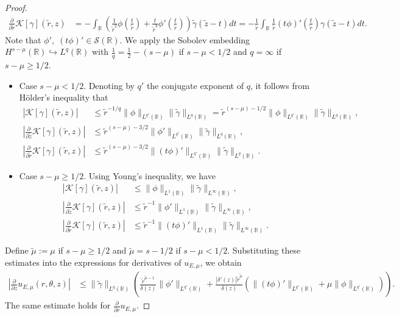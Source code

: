 ﻿\documentclass[11pt,reqno,oneside]{amsart}
\theoremstyle{definition}
\theoremstyle{remark}
\newcommand{\R}{\mathbb{R}}
\newcommand{\Sw}{\mathcal{S}}
\renewcommand{\d}{\delta}
\newcommand{\g}{\gamma}
\renewcommand{\t}{\theta}
\newcommand{\p}{\partial}
\begin{document}
\begin{proof}
\begin{align*}
                \frac{\p}{\p \widetilde{r}}\mathcal{K}[\g](\widetilde{r},z)&= -\int_\R \left(\frac{1}{\widetilde{r}^2}\phi(\frac{t}{\widetilde{r}})+\frac{t}{\widetilde{r}^3}\phi'(\frac{t}{\widetilde{r}})\right)\widetilde{\g}(\widetilde{z}-t)dt=-\frac{1}{\widetilde{r}}\int_\R \frac{1}{\widetilde{r}}(t\phi)'(\frac{t}{\widetilde{r}})\g(\widetilde{z}-t)dt.
            \end{align*}
            Note that $\phi',\;(t\phi)'\in \Sw(\R)$. We apply the Sobolev embedding $H^{s-\mu}(\R)\hookrightarrow L^q(\R)$ with $\frac{1}{q}=\frac{1}{2}-(s-\mu)$ if $s-\mu<1/2$ and $q=\infty$ if $s-\mu\geq 1/2$.
            \begin{itemize}
                \item Case $s-\mu <1/2$. Denoting by $q'$ the conjugate exponent of $q$, it follows from H\"older's inequality that
                \begin{align*}
                    \left|\mathcal{K}[\g](\widetilde{r},z)\right| &\leq \widetilde{r}^{-1/q} \|\phi\|_{L^{q'}(\R)} \|\widetilde{\g}\|_{L^q(\R)}=\widetilde{r}^{(s-\mu)-1/2} \|\phi\|_{L^{q'}(\R)} \|\widetilde{\g}\|_{L^q(\R)},\\
                    \left|\frac{\p}{\p \widetilde{z}}\mathcal{K}[\g](\widetilde{r},z)\right| &\leq \widetilde{r}^{(s-\mu)-3/2} \|\phi'\|_{L^{q'}(\R)} \|\widetilde{\g}\|_{L^q(\R)},\\
                    \left|\frac{\p}{\p \widetilde{r}}\mathcal{K}[\g](\widetilde{r},z)\right| &\leq \widetilde{r}^{(s-\mu)-3/2} \|(t\phi)'\|_{L^{q'}(\R)} \|\widetilde{\g}\|_{L^q(\R)}.
                \end{align*}
                \item Case $s-\mu\geq 1/2$. Using Young's inequality, we have
                \begin{align*}
                    |\mathcal{K}[\g](\widetilde{r},z)| &\leq \|\phi\|_{L^1(\R)} \|\widetilde{\g}\|_{L^\infty(\R)},\\
                    \left|\frac{\p}{\p \widetilde{z}}\mathcal{K}[\g](\widetilde{r},z)\right| &\leq \widetilde{r}^{-1} \|\phi'\|_{L^1(\R)} \|\widetilde{\g}\|_{L^\infty(\R)},\\
                    \left|\frac{\p}{\p \widetilde{r}}\mathcal{K}[\g](\widetilde{r},z)\right| &\leq \widetilde{r}^{-1} \|(t\phi)'\|_{L^1(\R)} \|\widetilde{\g}\|_{L^\infty(\R)}.
                \end{align*}
            \end{itemize}
            Define $\widetilde{\mu}:=\mu$ if $s-\mu\geq 1/2$ and $\widetilde{\mu}=s-1/2$ if $s-\mu<1/2$. Substituting these estimates into the expressions for derivatives of $u_{E,\mu}$, we obtain
            \begin{align*}
                \left|\frac{\p}{\p z} u_{E,\mu}(r,\t,z)\right| &\leq \|\widetilde{\g}\|_{L^q(\R)} \left(\frac{\widetilde{r}^{\widetilde{\mu}-1}}{\d(z)} \|\phi'\|_{L^{q'}(\R)} + \frac{|\d'(z)| \widetilde{r}^{\widetilde{\mu}}}{\d(z)}(\|(t\phi)'\|_{L^{q'}(\R)}+\mu \|\phi\|_{L^{q'}(\R)})\right).
            \end{align*}
            The same estimate holds for $\frac{\p}{\p r} u_{E,\mu}$.


\end{proof}
\end{document}
